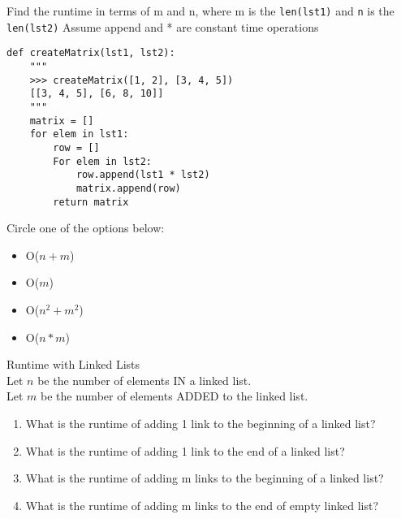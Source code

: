 \documentclass{exam}
\begin{document}
\begin{questions}
\clearpage

\item Find the runtime in terms of m and n, where m is the \texttt{len(lst1)} and \texttt{n} is the \texttt{len(lst2)}
Assume append and * are constant time operations
\begin{lstlisting}
def createMatrix(lst1, lst2): 
    """
    >>> createMatrix([1, 2], [3, 4, 5])
    [[3, 4, 5], [6, 8, 10]]
    """ 
    matrix = []
    for elem in lst1:
        row = []
        For elem in lst2:
            row.append(lst1 * lst2)
            matrix.append(row)
        return matrix
\end{lstlisting}
Circle one of the options below:
\begin{itemize}
\item O($n + m$)
\item O($m$)
\item O($n^2 + m^2$)
\item O($n * m$)
\end{itemize}

\item Runtime with Linked Lists\\
Let $n$ be the number of elements IN a linked list.\\
Let $m$ be the number of elements ADDED to the linked list.
\begin{enumerate}
\item What is the runtime of adding 1 link to the beginning of a linked list?
\vspace{1cm}
\item What is the runtime of adding 1 link to the end of a linked list?
\vspace{1cm}
\item What is the runtime of adding m links to the beginning of a linked list?
\vspace{1cm}
\item What is the runtime of adding m links to the end of empty linked list?
\end{enumerate}

\end{questions}


\end{document}

